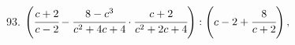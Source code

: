 93. $\left(\cfrac{c+2}{c-2}-\cfrac{8-c^3}{c^2+4c+4}\cdot\cfrac{c+2}{c^2+2c+4}\right):\left(c-2+\cfrac{8}{c+2}\right),$\\

